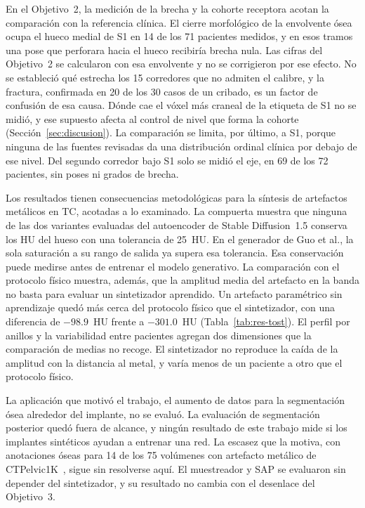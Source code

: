En el Objetivo~2, la medición de la brecha y la cohorte receptora acotan la comparación con la referencia clínica. El cierre morfológico de la envolvente ósea ocupa el hueco medial de S1 en 14 de los 71 pacientes medidos, y en esos tramos una pose que perforara hacia el hueco recibiría brecha nula. Las cifras del Objetivo~2 se calcularon con esa envolvente y no se corrigieron por ese efecto. No se estableció qué estrecha los 15 corredores que no admiten el calibre, y la fractura, confirmada en 20 de los 30 casos de un cribado, es un factor de confusión de esa causa. Dónde cae el vóxel más craneal de la etiqueta de S1 no se midió, y ese supuesto afecta al control de nivel que forma la cohorte (Sección~\ref{sec:discusion}). La comparación se limita, por último, a S1, porque ninguna de las fuentes revisadas da una distribución ordinal clínica por debajo de ese nivel. Del segundo corredor bajo S1 solo se midió el eje, en 69 de los 72 pacientes, sin poses ni grados de brecha.


Los resultados tienen consecuencias metodológicas para la síntesis de artefactos metálicos en TC, acotadas a lo examinado. La compuerta muestra que ninguna de las dos variantes evaluadas del autoencoder de Stable Diffusion~1.5 conserva los HU del hueso con una tolerancia de 25~HU. En el generador de Guo et al., la sola saturación a su rango de salida ya supera esa tolerancia. Esa conservación puede medirse antes de entrenar el modelo generativo. La comparación con el protocolo físico muestra, además, que la amplitud media del artefacto en la banda no basta para evaluar un sintetizador aprendido. Un artefacto paramétrico sin aprendizaje quedó más cerca del protocolo físico que el sintetizador, con una diferencia de $-98.9$~HU frente a $-301.0$~HU (Tabla~\ref{tab:res-tost}). El perfil por anillos y la variabilidad entre pacientes agregan dos dimensiones que la comparación de medias no recoge. El sintetizador no reproduce la caída de la amplitud con la distancia al metal, y varía menos de un paciente a otro que el protocolo físico.

La aplicación que motivó el trabajo, el aumento de datos para la segmentación ósea alrededor del implante, no se evaluó. La evaluación de segmentación posterior quedó fuera de alcance, y ningún resultado de este trabajo mide si los implantes sintéticos ayudan a entrenar una red. La escasez que la motiva, con anotaciones óseas para 14 de los 75 volúmenes con artefacto metálico de CTPelvic1K~\cite{liu2021ctpelvic1k}, sigue sin resolverse aquí. El muestreador y SAP se evaluaron sin depender del sintetizador, y su resultado no cambia con el desenlace del Objetivo~3.  
